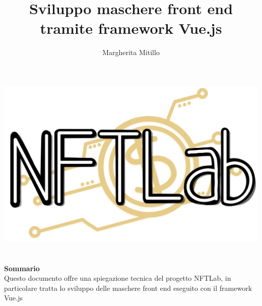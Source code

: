 


\setcounter{secnumdepth}{5}
\setcounter{tocdepth}{5}



\makeatletter
\begin{titlepage}
	\begin{center}
		\vspace*{-1,0cm}
		\title{Sviluppo maschere front end tramite framework Vue.js}
		\author{Margherita Mitillo}
		\date{} %
		\includegraphics[width=0.5\linewidth]{immagini/logo.jpg}\\[4ex]
		{\huge \bfseries  \@title }\\[2ex]
		{\LARGE  \@author}\\[50ex]
		\vspace*{-5,0cm}
		\vspace{0.2cm}
		\hfill \break
		\fontsize{17}{10}\textbf{Sommario} \\
		\vspace{0.3cm}
		Questo documento offre una spiegazione tecnica del progetto NFTLab, in particolare tratta lo sviluppo delle maschere front end eseguito con il framework Vue.js
	\end{center}
\end{titlepage}
\makeatother

\tableofcontents{}




